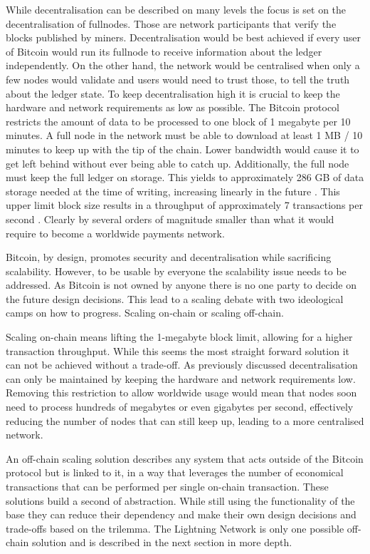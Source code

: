 \documentclass[final]{fhnwreport}       %
\begin{document}
While decentralisation can be described on many levels the focus is set on the decentralisation of \glspl{fullnode}. Those are network participants that verify the blocks published by miners. Decentralisation would be best achieved if every user of Bitcoin would run its \gls{fullnode} to receive information about the ledger independently. On the other hand, the network would be centralised when only a few nodes would validate and users would need to trust those, to tell the truth about the ledger state. To keep decentralisation high it is crucial to keep the hardware and network requirements as low as possible. The Bitcoin protocol restricts the amount of data to be processed to one block of 1 megabyte per 10 minutes. A full node in the network must be able to download at least 1 MB / 10 minutes to keep up with the tip of the chain. Lower bandwidth would cause it to get left behind without ever being able to catch up. Additionally, the full node must keep the full ledger on storage. This yields to approximately 286 GB of data storage needed at the time of writing, increasing linearly in the future \citep{noauthor_block-size_nodate}. This upper limit block size results in a throughput of approximately 7 transactions per second \citep{poon_bitcoin_2016}. Clearly by several orders of magnitude smaller than what it would require to become a worldwide payments network. 

Bitcoin, by design, promotes security and decentralisation while sacrificing scalability. However, to be usable by everyone the scalability issue needs to be addressed. As Bitcoin is not owned by anyone there is no one party to decide on the future design decisions. This lead to a scaling debate with two ideological camps on how to progress. Scaling on-chain or scaling off-chain.

Scaling on-chain means lifting the 1-megabyte block limit, allowing for a higher transaction throughput. While this seems the most straight forward solution it can not be achieved without a trade-off. As previously discussed decentralisation can only be maintained by keeping the hardware and network requirements low. Removing this restriction to allow worldwide usage would mean that nodes soon need to process hundreds of megabytes or even gigabytes per second, effectively reducing the number of nodes that can still keep up, leading to a more centralised network. 

An off-chain scaling solution describes any system that acts outside of the Bitcoin protocol but is linked to it, in a way that leverages the number of economical transactions that can be performed per single on-chain transaction. These solutions build a \gls{second} of abstraction. While still using the functionality of the \gls{base} they can reduce their dependency and make their own design decisions and trade-offs based on the \gls{trilemma}. The Lightning Network is only one possible off-chain solution and is described in the next section in more depth. 
\end{document}
